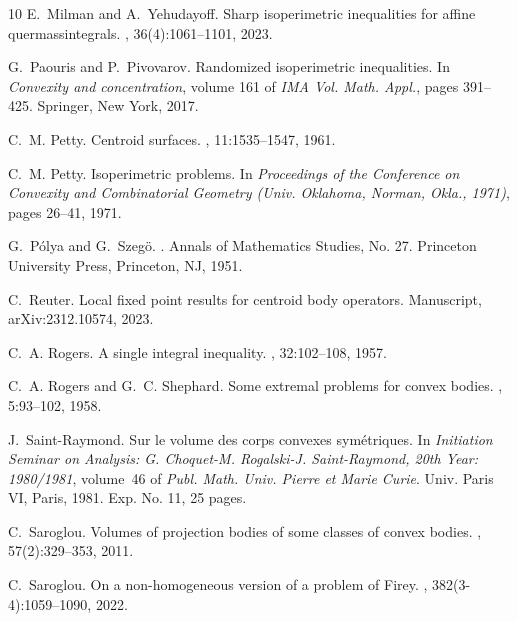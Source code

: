 \documentclass[11pt]{article}
\theoremstyle{definition}
\theoremstyle{proof}
\DeclareMathOperator{\+}{\mathop{\tilde{+}}}
\numberwithin{equation}{section}
\numberwithin{equation}{section}
\begin{document}
\begin{thebibliography}{10}
E.~Milman and A.~Yehudayoff.
\newblock Sharp isoperimetric inequalities for affine quermassintegrals.
, 36(4):1061--1101, 2023.

G.~Paouris and P.~Pivovarov.
\newblock Randomized isoperimetric inequalities.
\newblock In {\em Convexity and concentration}, volume 161 of {\em IMA Vol.
  Math. Appl.}, pages 391--425. Springer, New York, 2017.

C.~M. Petty.
\newblock Centroid surfaces.
, 11:1535--1547, 1961.

C.~M. Petty.
\newblock Isoperimetric problems.
\newblock In {\em Proceedings of the {C}onference on {C}onvexity and
  {C}ombinatorial {G}eometry ({U}niv. {O}klahoma, {N}orman, {O}kla., 1971)},
  pages 26--41, 1971.

G.~P\'{o}lya and G.~Szeg\"{o}.
.
\newblock Annals of Mathematics Studies, No. 27. Princeton University Press,
  Princeton, NJ, 1951.

C.~Reuter.
\newblock Local fixed point results for centroid body operators.
\newblock Manuscript, arXiv:2312.10574, 2023.

C.~A. Rogers.
\newblock A single integral inequality.
, 32:102--108, 1957.

C.~A. Rogers and G.~C. Shephard.
\newblock Some extremal problems for convex bodies.
, 5:93--102, 1958.

J.~Saint-Raymond.
\newblock Sur le volume des corps convexes sym\'{e}triques.
\newblock In {\em Initiation {S}eminar on {A}nalysis: {G}. {C}hoquet-{M}.
  {R}ogalski-{J}. {S}aint-{R}aymond, 20th {Y}ear: 1980/1981}, volume~46 of {\em
  Publ. Math. Univ. Pierre et Marie Curie}. Univ. Paris VI, Paris, 1981.
\newblock Exp. No. 11, 25 pages.

C.~Saroglou.
\newblock Volumes of projection bodies of some classes of convex bodies.
, 57(2):329--353, 2011.

C.~Saroglou.
\newblock On a non-homogeneous version of a problem of {F}irey.
, 382(3-4):1059--1090, 2022.


\end{thebibliography}
\end{document}

